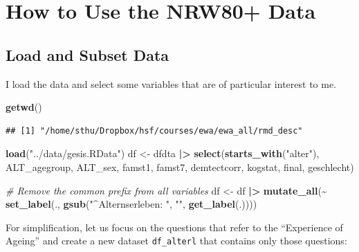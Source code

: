 \documentclass[
  doc]{apa6}
\newenvironment{Shaded}{\begin{snugshade}}{\end{snugshade}}
\newcommand{\CommentTok}[1]{\textcolor[rgb]{0.56,0.35,0.01}{\textit{#1}}}
\newcommand{\FunctionTok}[1]{\textcolor[rgb]{0.13,0.29,0.53}{\textbf{#1}}}
\newcommand{\NormalTok}[1]{#1}
\newcommand{\OtherTok}[1]{\textcolor[rgb]{0.56,0.35,0.01}{#1}}
\newcommand{\SpecialCharTok}[1]{\textcolor[rgb]{0.81,0.36,0.00}{\textbf{#1}}}
\newcommand{\StringTok}[1]{\textcolor[rgb]{0.31,0.60,0.02}{#1}}
\begin{document}
\hypertarget{how-to-use-the-nrw80-data}{%
\section{How to Use the NRW80+ Data}\label{how-to-use-the-nrw80-data}}

\hypertarget{sec-load}{%
\subsection{Load and Subset Data}\label{sec-load}}

I load the data and select some variables that are of particular interest to me.

\begin{Shaded}
\begin{Highlighting}[]
\FunctionTok{getwd}\NormalTok{()}
\end{Highlighting}
\end{Shaded}

\begin{verbatim}
## [1] "/home/sthu/Dropbox/hsf/courses/ewa/ewa_all/rmd_desc"
\end{verbatim}

\begin{Shaded}
\begin{Highlighting}[]
\FunctionTok{load}\NormalTok{(}\StringTok{"../data/gesis.RData"}\NormalTok{)}
\NormalTok{df }\OtherTok{\textless{}{-}}\NormalTok{ dfdta }\SpecialCharTok{|\textgreater{}}
  \FunctionTok{select}\NormalTok{(}\FunctionTok{starts\_with}\NormalTok{(}\StringTok{"alter"}\NormalTok{), }
\NormalTok{         ALT\_agegroup, }
\NormalTok{         ALT\_sex, }
\NormalTok{         famst1, famst7, }
\NormalTok{         demtectcorr, }
\NormalTok{         kogstat, }
\NormalTok{         final, }
\NormalTok{         geschlecht)}

\CommentTok{\# Remove the common prefix from all variables}
\NormalTok{df }\OtherTok{\textless{}{-}}\NormalTok{ df }\SpecialCharTok{|\textgreater{}} 
  \FunctionTok{mutate\_all}\NormalTok{(}\SpecialCharTok{\textasciitilde{}} \FunctionTok{set\_label}\NormalTok{(., }\FunctionTok{gsub}\NormalTok{(}\StringTok{"\^{}Alternserleben: "}\NormalTok{, }\StringTok{""}\NormalTok{, }\FunctionTok{get\_label}\NormalTok{(.))))}
\end{Highlighting}
\end{Shaded}

For simplification, let us focus on the questions that refer to the ``Experience of Ageing'' and create a new dataset \texttt{df\_alterl} that contains only those questions:
\end{document}
